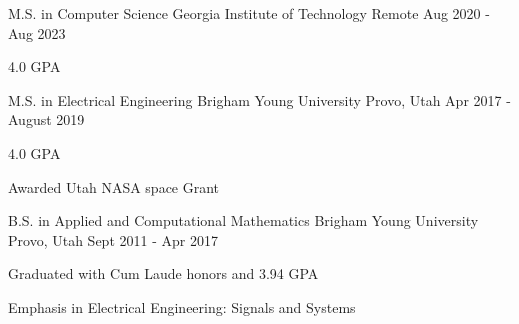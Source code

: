 

\begin{cventries}
  \cventry
    {M.S. in Computer Science} %
    {Georgia Institute of Technology} %
    {Remote} %
    {Aug 2020 - Aug 2023} %
    {
      \begin{cvitems}
        \item {4.0 GPA}
      \end{cvitems}
    }

  \cventry
    {M.S. in Electrical Engineering} %
    {Brigham Young University} %
    {Provo, Utah} %
    {Apr 2017 - August 2019} %
    {
      \begin{cvitems}
        \item {4.0 GPA}
        \item {Awarded Utah NASA space Grant}
      \end{cvitems}
    }

  \cventry
    {B.S. in Applied and Computational Mathematics} %
    {Brigham Young University} %
    {Provo, Utah} %
    {Sept 2011 - Apr 2017} %
    {
      \begin{cvitems} %
        \item {Graduated with Cum Laude honors and 3.94 GPA}
        \item {Emphasis in Electrical Engineering: Signals and Systems}
      \end{cvitems}
    }

\end{cventries}

